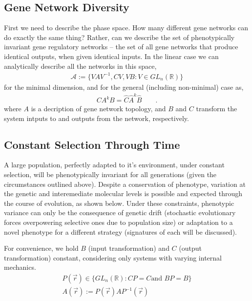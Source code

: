 \documentclass[11 pt]{article}
\newcommand{\1}{\mathbbm{1}}
\begin{document}
 \subsection{Gene Network Diversity}
      First we need to describe the phase space. How many different gene networks can do exactly the same thing? Rather, can we describe the set of phenotypically invariant gene regulatory networks -- the set of all gene networks that produce identical outputs, when given identical inputs. In the linear case we can analytically describe all the networks in this space,
      \begin{align*}
        \mathcal{A} := \{ VAV^{-1}, CV, VB : V \in GL_{n}(\mathbb{R}) \}
      \end{align*}
      for the minimal dimension, and for the general (including non-minimal) case as,
      \begin{align*}
        CA^{k}B = \widehat{C} \widehat{A}^{k} \widehat{B} \qquad .
      \end{align*}
      where $A$ is a decription of gene network topology, and $B$ and $C$ transform the system intputs to and outputs from the network, respectively. 

  \subsection{Constant Selection Through Time}

    A large population, perfectly adapted to it's environment, under constant selection, will be phenotypically invariant for all generations (given the circumstances outlined above). Despite a conservation of phenotype, variation at the genetic and interemediate molecular levels is possible and expected through the course of evolution, as shown below. Under these constraints, phenotypic variance can only be the consequence of genetic drift (stochastic evolutionary forces overpowering selective ones due to population size) or adaptation to a novel phenotype for a different strategy (signatures of each will be discussed).

      For convenience, we hold $B$ (input transformation) and $C$ (output transformation) constant, considering only systems with varying internal mechanics.
      \begin{align*}
        P(\vec{r}) \in \{ GL_{n}(\mathbb{R}) : CP = C \text{and } BP = B \} \\
        A(\vec{r}) := P(\vec{r}) A P^{-1}(\vec{r})
      \end{align*}
\end{document}
